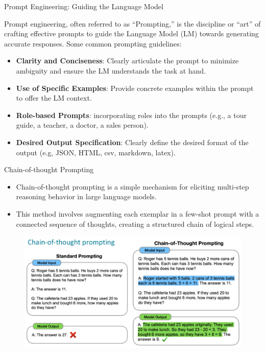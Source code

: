 \documentclass[handout]{beamer}
\begin{document}
\begin{frame}{Prompt Engineering: Guiding the Language Model}
\begin{scriptsize}
Prompt engineering, often referred to as ``Prompting,'' is the discipline or ``art'' of crafting effective prompts to guide the Language Model (LM) towards generating accurate responses. Some common prompting guidelines: \vspace{0.5cm}

\begin{itemize}
\item \textbf{Clarity and Conciseness}: Clearly articulate the prompt to minimize ambiguity and ensure the LM understands the task at hand.
\item \textbf{Use of Specific Examples}: Provide concrete examples within the prompt to offer the LM context.
\item \textbf{Role-based Prompts}: incorporating roles into the prompts (e.g., a tour guide, a teacher, a doctor, a sales person).
\item \textbf{Desired Output Specification}: Clearly define the desired format of the output (e.g, JSON, HTML, csv, markdown, latex).
\end{itemize}
\end{scriptsize}
\end{frame}


\begin{frame}{Chain-of-thought Prompting}

\begin{scriptsize}
\begin{itemize}
\item Chain-of-thought prompting is a simple mechanism for eliciting multi-step reasoning behavior in large language models.
\item  This method involves augmenting each exemplar in a few-shot prompt with a connected sequence of thoughts, creating a structured chain of logical steps. \cite{wei2022chain}
\end{itemize}
\end{scriptsize}



 \begin{figure}[h]
        	\includegraphics[scale = 0.3]{pics/chainoftought.png}
        \end{figure}



\end{frame}
\end{document}
